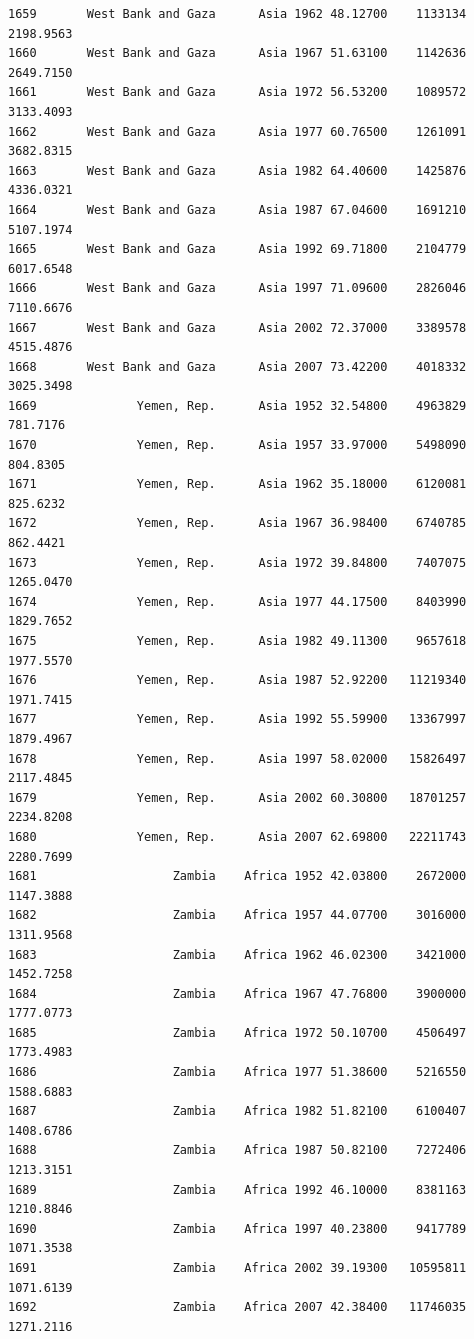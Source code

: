 \documentclass[
  letterpaper,
  DIV=11,
  numbers=noendperiod]{scrreprt}
\begin{document}
\begin{verbatim}
1659       West Bank and Gaza      Asia 1962 48.12700    1133134   2198.9563
1660       West Bank and Gaza      Asia 1967 51.63100    1142636   2649.7150
1661       West Bank and Gaza      Asia 1972 56.53200    1089572   3133.4093
1662       West Bank and Gaza      Asia 1977 60.76500    1261091   3682.8315
1663       West Bank and Gaza      Asia 1982 64.40600    1425876   4336.0321
1664       West Bank and Gaza      Asia 1987 67.04600    1691210   5107.1974
1665       West Bank and Gaza      Asia 1992 69.71800    2104779   6017.6548
1666       West Bank and Gaza      Asia 1997 71.09600    2826046   7110.6676
1667       West Bank and Gaza      Asia 2002 72.37000    3389578   4515.4876
1668       West Bank and Gaza      Asia 2007 73.42200    4018332   3025.3498
1669              Yemen, Rep.      Asia 1952 32.54800    4963829    781.7176
1670              Yemen, Rep.      Asia 1957 33.97000    5498090    804.8305
1671              Yemen, Rep.      Asia 1962 35.18000    6120081    825.6232
1672              Yemen, Rep.      Asia 1967 36.98400    6740785    862.4421
1673              Yemen, Rep.      Asia 1972 39.84800    7407075   1265.0470
1674              Yemen, Rep.      Asia 1977 44.17500    8403990   1829.7652
1675              Yemen, Rep.      Asia 1982 49.11300    9657618   1977.5570
1676              Yemen, Rep.      Asia 1987 52.92200   11219340   1971.7415
1677              Yemen, Rep.      Asia 1992 55.59900   13367997   1879.4967
1678              Yemen, Rep.      Asia 1997 58.02000   15826497   2117.4845
1679              Yemen, Rep.      Asia 2002 60.30800   18701257   2234.8208
1680              Yemen, Rep.      Asia 2007 62.69800   22211743   2280.7699
1681                   Zambia    Africa 1952 42.03800    2672000   1147.3888
1682                   Zambia    Africa 1957 44.07700    3016000   1311.9568
1683                   Zambia    Africa 1962 46.02300    3421000   1452.7258
1684                   Zambia    Africa 1967 47.76800    3900000   1777.0773
1685                   Zambia    Africa 1972 50.10700    4506497   1773.4983
1686                   Zambia    Africa 1977 51.38600    5216550   1588.6883
1687                   Zambia    Africa 1982 51.82100    6100407   1408.6786
1688                   Zambia    Africa 1987 50.82100    7272406   1213.3151
1689                   Zambia    Africa 1992 46.10000    8381163   1210.8846
1690                   Zambia    Africa 1997 40.23800    9417789   1071.3538
1691                   Zambia    Africa 2002 39.19300   10595811   1071.6139
1692                   Zambia    Africa 2007 42.38400   11746035   1271.2116

\end{verbatim}
\end{document}
